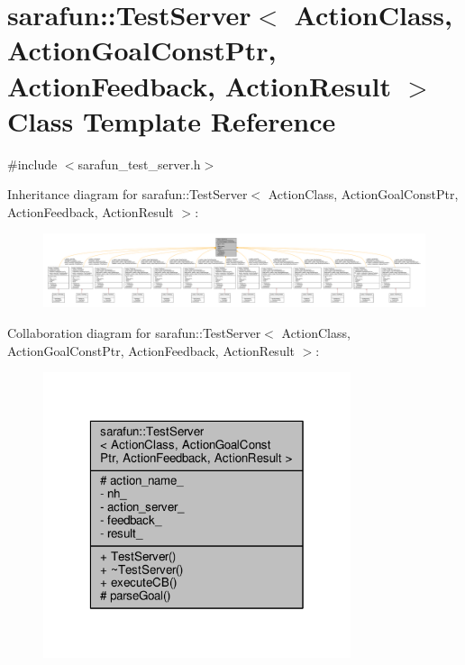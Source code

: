 \hypertarget{classsarafun_1_1TestServer}{\section{sarafun\-:\-:Test\-Server$<$ Action\-Class, Action\-Goal\-Const\-Ptr, Action\-Feedback, Action\-Result $>$ Class Template Reference}
\label{classsarafun_1_1TestServer}
}


{\ttfamily \#include $<$sarafun\-\_\-test\-\_\-server.\-h$>$}



Inheritance diagram for sarafun\-:\-:Test\-Server$<$ Action\-Class, Action\-Goal\-Const\-Ptr, Action\-Feedback, Action\-Result $>$\-:
\nopagebreak
\begin{figure}[H]
\begin{center}
\leavevmode
\includegraphics[width=350pt]{d5/dfc/classsarafun_1_1TestServer__inherit__graph}
\end{center}
\end{figure}


Collaboration diagram for sarafun\-:\-:Test\-Server$<$ Action\-Class, Action\-Goal\-Const\-Ptr, Action\-Feedback, Action\-Result $>$\-:
\nopagebreak
\begin{figure}[H]
\begin{center}
\leavevmode
\includegraphics[width=256pt]{da/d4e/classsarafun_1_1TestServer__coll__graph}
\end{center}
\end{figure}
